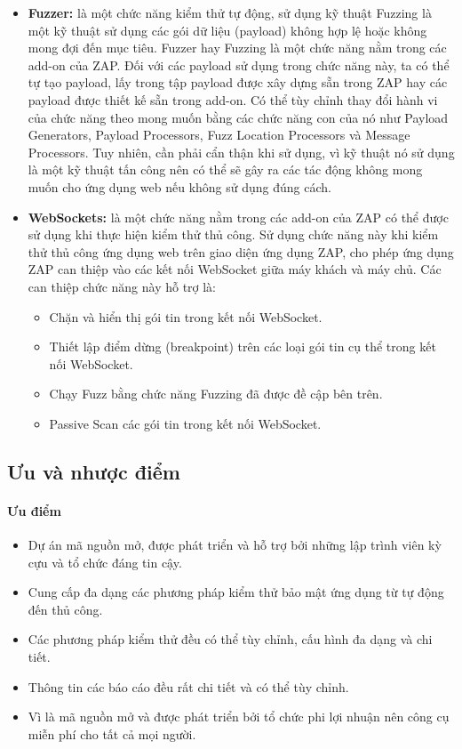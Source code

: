 \begin{itemize}
  \item \textbf{Fuzzer:} là một chức năng kiểm thử tự động, sử dụng kỹ thuật Fuzzing là một kỹ thuật sử dụng các gói dữ liệu (payload) không hợp lệ hoặc không mong đợi đến mục tiêu. Fuzzer hay Fuzzing là một chức năng nằm trong các add-on của ZAP. Đối với các payload sử dụng trong chức năng này, ta có thể tự tạo payload, lấy trong tập payload được xây dựng sẵn trong ZAP hay các payload được thiết kế sẵn trong add-on. Có thể tùy chỉnh thay đổi hành vi của chức năng theo mong muốn bằng các chức năng con của nó như Payload Generators, Payload Processors, Fuzz Location Processors và Message Processors. Tuy nhiên, cần phải cẩn thận khi sử dụng, vì kỹ thuật nó sử dụng là một kỹ thuật tấn công nên có thể sẽ gây ra các tác động không mong muốn cho ứng dụng web nếu không sử dụng đúng cách.
  \item \textbf{WebSockets:} là một chức năng nằm trong các add-on của ZAP có thể được sử dụng khi thực hiện kiểm thử thủ công. Sử dụng chức năng này khi kiểm thử thủ công ứng dụng web trên giao diện ứng dụng ZAP, cho phép ứng dụng ZAP can thiệp vào các kết nối WebSocket giữa máy khách và máy chủ. Các can thiệp chức năng này hỗ trợ là:
        \begin{itemize}
          \item Chặn và hiển thị gói tin trong kết nối WebSocket.
          \item Thiết lập điểm dừng (breakpoint) trên các loại gói tin cụ thể trong kết nối WebSocket.
          \item Chạy Fuzz bằng chức năng Fuzzing đã được đề cập bên trên.
          \item Passive Scan các gói tin trong kết nối WebSocket.
        \end{itemize}
\end{itemize}

\subsection{Ưu và nhược điểm}

\paragraph{Ưu điểm}
\begin{itemize}
  \item Dự án mã nguồn mở, được phát triển và hỗ trợ bởi những lập trình viên kỳ cựu và tổ chức đáng tin cậy.
  \item Cung cấp đa dạng các phương pháp kiểm thử bảo mật ứng dụng từ tự động đến thủ công.
  \item Các phương pháp kiểm thử đều có thể tùy chỉnh, cấu hình đa dạng và chi tiết.
  \item Thông tin các báo cáo đều rất chi tiết và có thể tùy chỉnh.
  \item Vì là mã nguồn mở và được phát triển bởi tổ chức phi lợi nhuận nên công cụ miễn phí cho tất cả mọi người.
\end{itemize}

